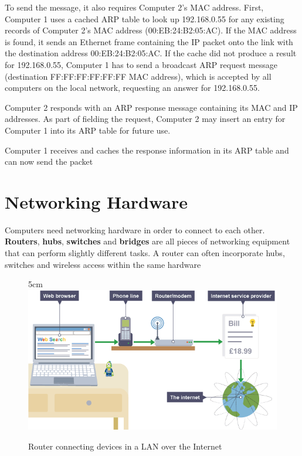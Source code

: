 \documentclass[a4paper,12pt]{article}
\begin{document}
To send the message, it also requires Computer 2's MAC address. First, Computer 1 uses a cached ARP table to look up 192.168.0.55 for any existing records of Computer 2's MAC address (00:EB:24:B2:05:AC). If the MAC address is found, it sends an Ethernet frame containing the IP packet onto the link with the destination address 00:EB:24:B2:05:AC. If the cache did not produce a result for 192.168.0.55, Computer 1 has to send a broadcast ARP request message (destination FF:FF:FF:FF:FF:FF MAC address), which is accepted by all computers on the local network, requesting an answer for 192.168.0.55.

Computer 2 responds with an ARP response message containing its MAC and IP addresses. As part of fielding the request, Computer 2 may insert an entry for Computer 1 into its ARP table for future use.

Computer 1 receives and caches the response information in its ARP table and can now send the packet

\clearpage

\section{Networking Hardware}
Computers need networking hardware in order to connect to each other. \textbf{Routers}, \textbf{hubs}, \textbf{switches} and \textbf{bridges} are all pieces of networking equipment that can perform slightly different tasks. A router can often incorporate hubs, switches and wireless access within the same hardware

\begin{figure}[18]{5cm}
\centering
\includegraphics[width=16cm]{./large.PNG}
\caption{Router connecting devices in a LAN over the Internet}\label{wrap-fig:4}
\end{figure}
\end{document}
